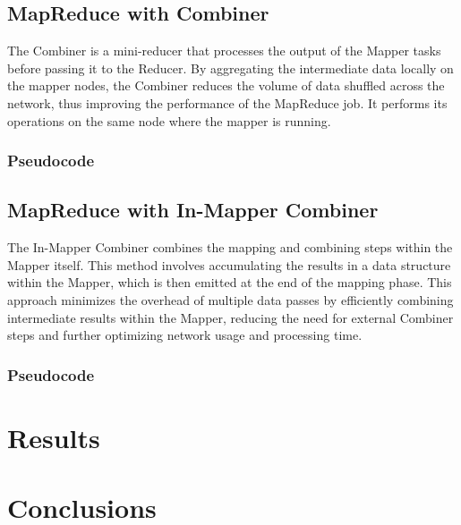 \documentclass[a4paper, 12pt]{article}
\begin{document}
\subsection{MapReduce with Combiner}
The Combiner is a mini-reducer that processes the output of the Mapper tasks before passing it to the Reducer. By aggregating the intermediate data locally on the mapper nodes, the Combiner reduces the volume of data shuffled across the network, thus improving the performance of the MapReduce job. It performs its operations on the same node where the mapper is running.
\subsubsection{Pseudocode}

\subsection{MapReduce with In-Mapper Combiner}
The In-Mapper Combiner combines the mapping and combining steps within the Mapper itself. This method involves accumulating the results in a data structure within the Mapper, which is then emitted at the end of the mapping phase. This approach minimizes the overhead of multiple data passes by efficiently combining intermediate results within the Mapper, reducing the need for external Combiner steps and further optimizing network usage and processing time.
\subsubsection{Pseudocode}


\section{Results}


\section{Conclusions}
\end{document}
